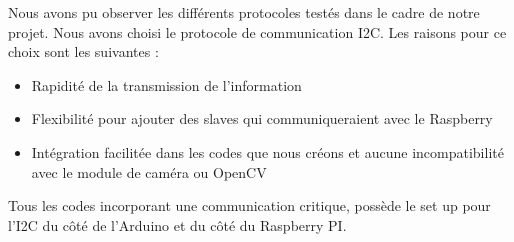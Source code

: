 \documentclass[
	a4paper,									%
	11pt,										%
	twoside,									%
	openright,									%
	notitlepage,									%
	parskip=half,								%
]{scrreprt}										%
\begin{document}
Nous avons pu observer les différents protocoles testés dans le cadre de notre projet. Nous avons choisi le protocole 
de communication I2C. Les raisons pour ce choix sont les suivantes : 

\begin{itemize}
	\item Rapidité de la transmission de l'information
 	\item Flexibilité pour ajouter des slaves qui communiqueraient avec le Raspberry
  	\item Intégration facilitée dans les codes que nous créons et aucune incompatibilité avec le module de caméra ou OpenCV
\end{itemize}

Tous les codes incorporant une communication critique, possède le set up pour l'I2C du côté de l'Arduino et du côté du
Raspberry PI. 
\end{document}
